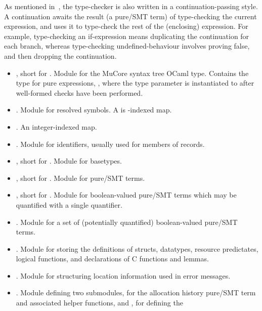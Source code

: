 As mentioned in~, the type-checker is also written in a
continuation-passing style. A continuation awaits the result (a pure/SMT term)
of type-checking the current expression, and uses it to type-check the rest of
the (enclosing) expression. For example, type-checking an if-expression means
duplicating the continuation for each branch, whereas type-checking
undefined-behaviour involves proving false, and then dropping the continuation.

\begin{itemize}
    \item {}, short for . Module for the
        MuCore syntax tree OCaml type. Contains the type for
        pure expressions, , where the type
        parameter is instantiated to  after
        well-formed checks have been performed.
    \item {}. Module for resolved symbols. A
         is -indexed map.
    \item {}. An integer-indexed map.
    \item {}. Module for identifiers, usually used for members of
        records.
    \item {}, short for . Module for
        basetypes.
    \item {}, short for . Module for
        pure/SMT terms.
    \item {}, short for . Module
        for boolean-valued pure/SMT terms which may be quantified with a single
        quantifier.
    \item {}. Module for a set of (potentially quantified)
        boolean-valued pure/SMT terms.
    \item {}. Module for storing the definitions of structs,
        datatypes, resource predictates, logical  functions, and
        declarations of C functions and  lemmas.
    \item {}. Module for structuring location information used
        in  error messages.
    \item {}. Module defining two submodules,
         for the allocation history pure/SMT term and associated
        helper functions, and , for defining the

\end{itemize}
